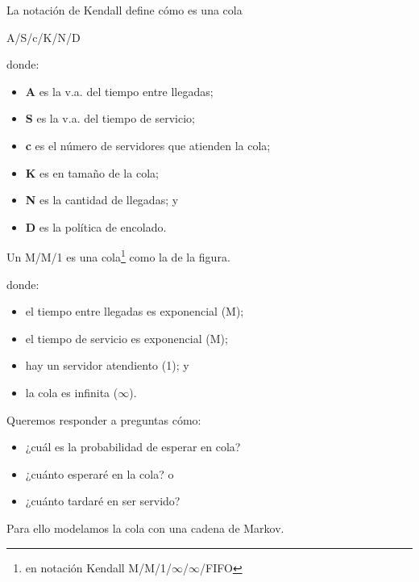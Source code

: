 \documentclass[xcolor={x11names}]{beamer}
\begin{document}
\begin{frame}{\secname}
    La notación de Kendall define cómo es 
    una cola
    \begin{center}
        A/S/c/K/N/D 
    \end{center}
    donde:
    \begin{itemize}
        \item \textbf{A} es la v.a. del tiempo
            entre llegadas;
        \item \textbf{S} es la v.a. del tiempo
            de servicio;
        \item \textbf{c} es el número de
            servidores que atienden la cola;
        \item \textbf{K} es en tamaño de la cola;
        \item \textbf{N} es la cantidad de
            llegadas; y
        \item \textbf{D} es la política de
            encolado.
    \end{itemize}
\end{frame}




\begin{frame}{\secname}
    Un M/M/1 es una cola\footnote{en notación
    Kendall M/M/1/$\infty$/$\infty$/FIFO}
    como la de la figura.

    \begin{figure}
        
    \end{figure}

    donde:
    \begin{itemize}
        \item el tiempo entre llegadas es
            exponencial (M);
        \item el tiempo de servicio es
            exponencial (M);
        \item hay un servidor atendiento (1); y
        \item la cola es infinita ($\infty$).
    \end{itemize}

\end{frame}




\begin{frame}{\secname}
    Queremos responder a preguntas cómo:
    \begin{itemize}
        \item ¿cuál es la probabilidad
            de esperar en cola?
        \item ¿cuánto esperaré en la cola? o
        \item ¿cuánto tardaré en ser servido?
    \end{itemize}

    \vfill

    Para ello modelamos la cola con una
    cadena de Markov.
\end{frame}
\end{document}
